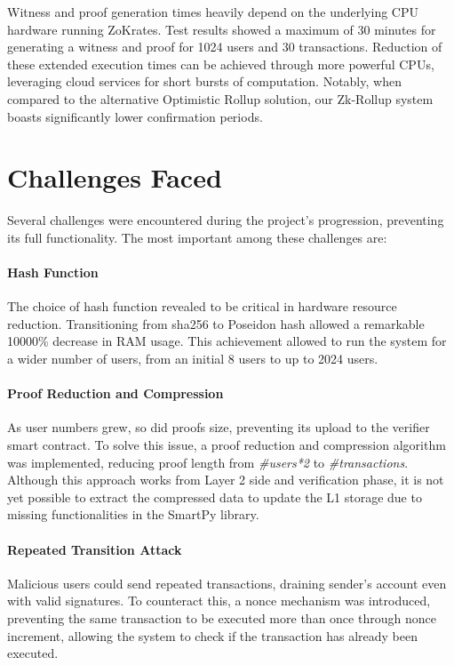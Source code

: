 Witness and proof generation times heavily depend on the underlying CPU hardware running ZoKrates. Test results showed a maximum of 30 minutes for generating a witness and proof for 1024 users and 30 transactions. Reduction of these extended execution times can be achieved through more powerful CPUs, leveraging cloud services for short bursts of computation. Notably, when compared to the alternative Optimistic Rollup solution, our Zk-Rollup system boasts significantly lower confirmation periods.

\section{Challenges Faced}

Several challenges were encountered during the project's progression, preventing its full functionality. The most important among these challenges are:
\vspace{-0.11in}
\paragraph{Hash Function} The choice of hash function revealed to be critical in hardware resource reduction. Transitioning from sha256 to Poseidon hash allowed a remarkable 10000\% decrease in RAM usage. This achievement allowed to run the system for a wider number of users, from an initial 8 users to up to 2024 users.
\vspace{-0.11in}
\paragraph{Proof Reduction and Compression} As user numbers grew, so did proofs size, preventing its upload to the verifier smart contract. To solve this issue, a proof reduction and compression algorithm was implemented, reducing proof length from \textit{\#users*2} to \textit{\#transactions}. Although this approach works from Layer 2 side and verification phase, it is not yet possible to extract the compressed data to update the L1 storage due to missing functionalities in the SmartPy library.
\vspace{-0.11in}
\paragraph{Repeated Transition Attack} Malicious users could send repeated transactions, draining sender's account even with valid signatures. To counteract this, a nonce mechanism was introduced, preventing the same transaction to be executed more than once through nonce increment, allowing the system to check if the transaction has already been executed.

